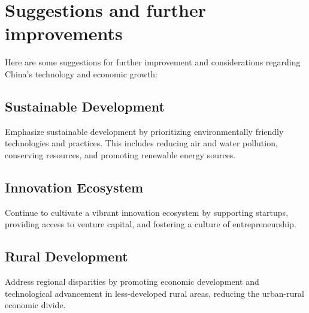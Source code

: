 \section{Suggestions and further improvements}

Here are some suggestions for further improvement and considerations regarding China's 
technology and economic growth:

\subsection{Sustainable Development}

Emphasize sustainable development by prioritizing environmentally friendly technologies 
and practices. This includes reducing air and water pollution, conserving resources, 
and promoting renewable energy sources.

\subsection{Innovation Ecosystem}

Continue to cultivate a vibrant innovation ecosystem by supporting startups, providing 
access to venture capital, and fostering a culture of entrepreneurship.

\subsection{Rural Development}

Address regional disparities by promoting economic development and technological 
advancement in less-developed rural areas, reducing the urban-rural economic divide.